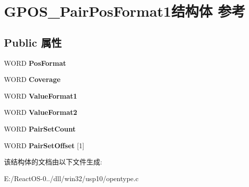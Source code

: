 \hypertarget{struct_g_p_o_s___pair_pos_format1}{}\section{G\+P\+O\+S\+\_\+\+Pair\+Pos\+Format1结构体 参考}
\label{struct_g_p_o_s___pair_pos_format1}
\subsection*{Public 属性}
\begin{DoxyCompactItemize}
\item 
\mbox{\label{struct_g_p_o_s___pair_pos_format1_afba170ebcd513f76822783c739a3e2a1}} 
W\+O\+RD {\bfseries Pos\+Format}
\item 
\mbox{\label{struct_g_p_o_s___pair_pos_format1_a1ca62b64477f9d04fea5c9889addba62}} 
W\+O\+RD {\bfseries Coverage}
\item 
\mbox{\label{struct_g_p_o_s___pair_pos_format1_a0f118684ece15b76dd2ffcd67522139e}} 
W\+O\+RD {\bfseries Value\+Format1}
\item 
\mbox{\label{struct_g_p_o_s___pair_pos_format1_a5205bd7fc6338a048b0879474ac19fe1}} 
W\+O\+RD {\bfseries Value\+Format2}
\item 
\mbox{\label{struct_g_p_o_s___pair_pos_format1_a8fe300ec102ec307900f213e22befb47}} 
W\+O\+RD {\bfseries Pair\+Set\+Count}
\item 
\mbox{\label{struct_g_p_o_s___pair_pos_format1_a624e9c47668fb32c814c5b871077466d}} 
W\+O\+RD {\bfseries Pair\+Set\+Offset} \mbox{[}1\mbox{]}
\end{DoxyCompactItemize}


该结构体的文档由以下文件生成\+:\begin{DoxyCompactItemize}
\item 
E\+:/\+React\+O\+S-\/0../dll/win32/usp10/opentype.\+c\end{DoxyCompactItemize}
